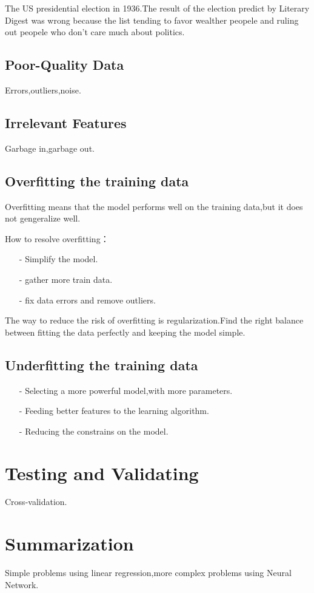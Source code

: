 \documentclass[UTF8]{ctexart}
\begin{document}
The US presidential election in 1936.The result of the election predict by Literary Digest was wrong because the list tending to favor wealther peopele and ruling out peopele who don't care much about politics.

\subsection{Poor-Quality Data}
Errors,outliers,noise.

\subsection{Irrelevant Features}
Garbage in,garbage out.

\subsection{Overfitting the training data}
Overfitting means that the model performs well on the training data,but it does not gengeralize well.

How to resolve overfitting：
\begin{itemize}
    \item[-] Simplify the model.
    \item[-] gather more train data.
    \item[-] fix data errors and remove outliers.
\end{itemize}

The way to reduce the risk of overfitting is regularization.Find the right balance between fitting the data perfectly and keeping the model simple.

\subsection{Underfitting the training data}

\begin{itemize}
    \item[-] Selecting a more powerful model,with more parameters.
    \item[-] Feeding better features to the learning algorithm.
    \item[-] Reducing the constrains on the model.
\end{itemize}

\section{Testing and Validating}
Cross-validation.

\section{Summarization}

Simple problems using linear regression,more complex problems using Neural Network.
\end{document}

